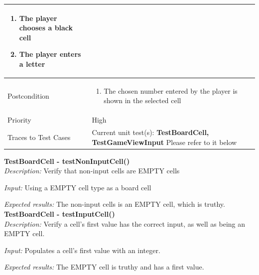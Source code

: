 \documentclass[12pt]{article}
\begin{document}
\begin{center}
\begin{tabular}{ |p{3.4cm}|p{12cm}| }
    \begin{enumerate}[leftmargin=0.2in]
        \item The player chooses a black cell 
        \item The player enters a letter
    \end{enumerate}  \\
    \hline
   Postcondition & 
    \vspace*{-0.1in}
    \begin{enumerate}[leftmargin=0.2in]
        \item The chosen number entered by the player is shown in the selected cell 
    \end{enumerate} \\
    \hline
    Priority & High  \\
    \hline
    \small{Traces to Test Cases} & Current unit test(s): \textbf{TestBoardCell, TestGameViewInput} 
    \newline
    Please refer to it below  
    \\
    \hline
\end{tabular}
\end{center}

\textbf{TestBoardCell - testNonInputCell()} \\

\textit{Description:} \newline
Verify that non-input cells are EMPTY cells \newline

\textit{Input:} \newline
Using a EMPTY cell type as a board cell \newline 

\textit{Expected results:} \newline
The non-input cells is an EMPTY cell, which is truthy.
\newline
\\

\textbf{TestBoardCell - testInputCell()} \\

\textit{Description:} \newline
Verify a cell's first value has the correct input, as well as being an EMPTY cell. \newline

\textit{Input:} \newline
Populates a cell's first value with an integer. \newline 

\textit{Expected results:} \newline
The EMPTY cell is truthy and has a first value. \newline
\\
\end{document}

